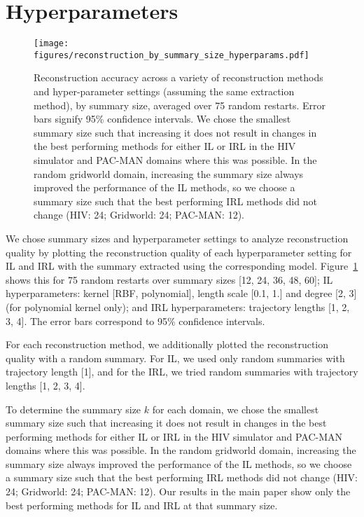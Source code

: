 \documentclass{article}
\begin{document}
\section{Hyperparameters}

\begin{figure}[h]
\centering
\texttt{[image: figures/reconstruction\_by\_summary\_size\_hyperparams.pdf]}
\caption{Reconstruction accuracy across a variety of reconstruction methods and hyper-parameter settings (assuming the same extraction method), by summary size, averaged over 75 random restarts. Error bars signify 95\% confidence intervals. We chose the smallest summary size such that increasing it does not result in changes in the best performing methods for either IL or IRL in the HIV simulator and PAC-MAN domains where this was possible. In the random gridworld domain, increasing the summary size always improved the performance of the IL methods, so we choose a summary size such that the best performing IRL methods did not change (HIV: 24; Gridworld: 24; PAC-MAN: 12).}
\label{fig:hyperparameters}
\end{figure}

We chose summary sizes and hyperparameter settings to analyze reconstruction quality by plotting the reconstruction quality of each hyperparameter setting for IL and IRL with the summary extracted using the corresponding model. Figure~\ref{fig:hyperparameters} shows this for 75 random restarts over summary sizes [12, 24, 36, 48, 60]; IL hyperparameters: kernel [RBF, polynomial], length scale [0.1, 1.] and degree [2, 3] (for polynomial kernel only); and IRL hyperparameters: trajectory lengths [1, 2, 3, 4]. The error bars correspond to 95\% confidence intervals.

For each reconstruction method, we additionally plotted the reconstruction quality with a random summary. For IL, we used only random summaries with trajectory length [1], and for the IRL, we tried random summaries with trajectory lengths [1, 2, 3, 4].

To determine the summary size $k$ for each domain, we chose the smallest summary size such that increasing it does not result in changes in the best performing methods for either IL or IRL in the HIV simulator and PAC-MAN domains where this was possible. In the random gridworld domain, increasing the summary size always improved the performance of the IL methods, so we choose a summary size such that the best performing IRL methods did not change (HIV: 24; Gridworld: 24; PAC-MAN: 12).  Our results in the main paper show only the best performing methods for IL and IRL at that summary size.
\end{document}
